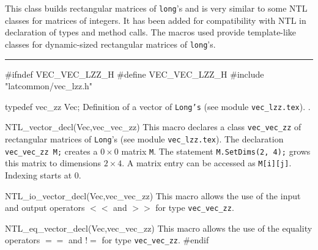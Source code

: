% 
% 
% 
% 

  
This class builds rectangular matrices of \texttt{long}'s and is very similar
to some NTL classes for matrices of integers. It has been added for compatibility
with NTL in declaration of types and method calls. The macros used provide 
template-like classes for dynamic-sized rectangular matrices of \texttt{long}'s.


\bigskip\hrule
\code\hide
#ifndef VEC_VEC_LZZ_H
#define VEC_VEC_LZZ_H
\endhide
#include "latcommon/vec_lzz.h"


typedef vec_zz Vec; 
\endcode
\tab 
  Definition of a vector of \texttt{Long's} (see module \texttt{vec\_lzz.tex}).
  .
\endtab
\code
          
NTL_vector_decl(Vec,vec_vec_zz)
\endcode
\tab This macro declares a class \texttt{vec\_vec\_zz} of rectangular matrices of
\texttt{Long}'s (see module \texttt{vec\_lzz.tex}). 
The declaration \texttt{vec\_vec\_zz M;} creates a $0\times0$
matrix \texttt{M}. The statement \texttt{M.SetDims(2, 4);} grows this matrix
to dimensions $2\times 4$. A matrix entry can be accessed as \texttt{M[i][j]}.
Indexing starts at 0.
\endtab
\code

NTL_io_vector_decl(Vec,vec_vec_zz)
\endcode
 \tab This macro allows the use of the input and output operators
 $\scriptstyle{<<}$ and $\scriptstyle{>>}$ for type  \texttt{vec\_vec\_zz}.
\endtab
\code

NTL_eq_vector_decl(Vec,vec_vec_zz)
\endcode
 \tab This macro allows the use of the equality operators $==$ and $!\!=$ for type 
  \texttt{vec\_vec\_zz}.
\endtab
\code\hide
#endif
\endhide\endcode

